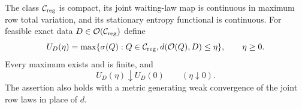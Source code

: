 \begin{proposition}
\label{prop:compact-priors}
The class $\mathcal C_{\rm reg}$ is compact, its joint waiting-law map is continuous
in maximum row total variation, and its stationary entropy functional is
continuous. For feasible exact data $D\in\mathcal O(\mathcal C_{\rm reg})$ define
\begin{equation}
 U_D(\eta)=\max\{\sigma(Q):Q\in\mathcal C_{\rm reg},
                      d(\mathcal O(Q),D)\le\eta\},\qquad\eta\ge0.
 \label{eq:compact-upper}
\end{equation}
Every maximum exists and is finite, and
\begin{equation}
 U_D(\eta)\downarrow U_D(0)\qquad(\eta\downarrow0).
 \label{eq:compact-limit}
\end{equation}
The assertion also holds with a metric generating weak convergence of
the joint row laws in place of $d$.
\end{proposition}
